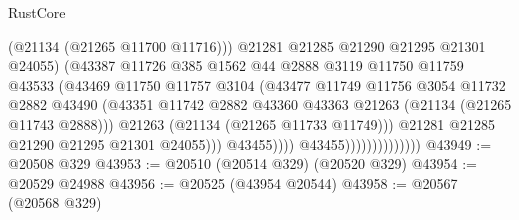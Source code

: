 \begin{lexlean}{RustCore}
\begin{coremodule}
                                              (@21134 (@21265 @11700 @11716)))
                                            @21281
                                            @21285
                                            @21290
                                            @21295
                                            @21301
                                            @24055)
                                          (@43387
                                            @11726
                                            @385
                                            @1562
                                            @44
                                            @2888
                                            @3119
                                            @11750
                                            @11759
                                            @43533
                                            (@43469
                                              @11750
                                              @11757
                                              @3104
                                              (@43477
                                                @11749
                                                @11756
                                                @3054
                                                @11732
                                                @2882
                                                @43490
                                                (@43351
                                                  @11742
                                                  @2882
                                                  @43360
                                                  @43363
                                                  @21263
                                                  (@21134 (@21265 @11743 @2888)))
                                                @21263
                                                (@21134 (@21265 @11733 @11749)))
                                              @21281
                                              @21285
                                              @21290
                                              @21295
                                              @21301
                                              @24055)))
                                        @43455))))
                                @43455))))))))))))))
@43949 := @20508 @329
@43953 := @20510 (@20514 @329) (@20520 @329)
@43954 := @20529 @24988
@43956 := @20525 (@43954 @20544)
@43958 := @20567 (@20568 @329)

\end{coremodule}
\end{lexlean}
